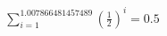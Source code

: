 \documentclass[preview]{standalone}
\begin{document}
\begin{align*}
\sum_{i=1}^{1.007866481457489} (\frac{1}{2})^i = {0.5}
\end{align*}
\end{document}
